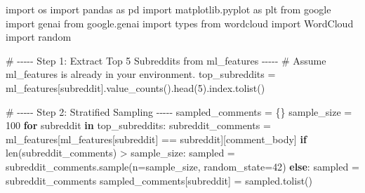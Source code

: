 \documentclass[
  12pt,
  letterpaper,
  DIV=11,
  numbers=noendperiod]{scrartcl}
\newenvironment{Shaded}{\begin{snugshade}}{\end{snugshade}}
\newcommand{\BuiltInTok}[1]{\textcolor[rgb]{0.00,0.23,0.31}{#1}}
\newcommand{\CommentTok}[1]{\textcolor[rgb]{0.37,0.37,0.37}{#1}}
\newcommand{\ControlFlowTok}[1]{\textcolor[rgb]{0.00,0.23,0.31}{\textbf{#1}}}
\newcommand{\DecValTok}[1]{\textcolor[rgb]{0.68,0.00,0.00}{#1}}
\newcommand{\ImportTok}[1]{\textcolor[rgb]{0.00,0.46,0.62}{#1}}
\newcommand{\KeywordTok}[1]{\textcolor[rgb]{0.00,0.23,0.31}{\textbf{#1}}}
\newcommand{\NormalTok}[1]{\textcolor[rgb]{0.00,0.23,0.31}{#1}}
\newcommand{\OperatorTok}[1]{\textcolor[rgb]{0.37,0.37,0.37}{#1}}
\newcommand{\StringTok}[1]{\textcolor[rgb]{0.13,0.47,0.30}{#1}}
\begin{document}
\begin{Shaded}
\begin{Highlighting}[]
\ImportTok{import}\NormalTok{ os}
\ImportTok{import}\NormalTok{ pandas }\ImportTok{as}\NormalTok{ pd}
\ImportTok{import}\NormalTok{ matplotlib.pyplot }\ImportTok{as}\NormalTok{ plt}
\ImportTok{from}\NormalTok{ google }\ImportTok{import}\NormalTok{ genai}
\ImportTok{from}\NormalTok{ google.genai }\ImportTok{import}\NormalTok{ types}
\ImportTok{from}\NormalTok{ wordcloud }\ImportTok{import}\NormalTok{ WordCloud}
\ImportTok{import}\NormalTok{ random}

\CommentTok{\# {-}{-}{-}{-}{-} Step 1: Extract Top 5 Subreddits from ml\_features {-}{-}{-}{-}{-}}
\CommentTok{\# Assume ml\_features is already in your environment.}
\NormalTok{top\_subreddits }\OperatorTok{=}\NormalTok{ ml\_features[}\StringTok{\textquotesingle{}subreddit\textquotesingle{}}\NormalTok{].value\_counts().head(}\DecValTok{5}\NormalTok{).index.tolist()}

\CommentTok{\# {-}{-}{-}{-}{-} Step 2: Stratified Sampling {-}{-}{-}{-}{-} }
\NormalTok{sampled\_comments }\OperatorTok{=}\NormalTok{ \{\}}
\NormalTok{sample\_size }\OperatorTok{=} \DecValTok{100}
\ControlFlowTok{for}\NormalTok{ subreddit }\KeywordTok{in}\NormalTok{ top\_subreddits:}
\NormalTok{    subreddit\_comments }\OperatorTok{=}\NormalTok{ ml\_features[ml\_features[}\StringTok{\textquotesingle{}subreddit\textquotesingle{}}\NormalTok{] }\OperatorTok{==}\NormalTok{ subreddit][}\StringTok{\textquotesingle{}comment\_body\textquotesingle{}}\NormalTok{]}
    \ControlFlowTok{if} \BuiltInTok{len}\NormalTok{(subreddit\_comments) }\OperatorTok{\textgreater{}}\NormalTok{ sample\_size:}
\NormalTok{        sampled }\OperatorTok{=}\NormalTok{ subreddit\_comments.sample(n}\OperatorTok{=}\NormalTok{sample\_size, random\_state}\OperatorTok{=}\DecValTok{42}\NormalTok{)}
    \ControlFlowTok{else}\NormalTok{:}
\NormalTok{        sampled }\OperatorTok{=}\NormalTok{ subreddit\_comments}
\NormalTok{    sampled\_comments[subreddit] }\OperatorTok{=}\NormalTok{ sampled.tolist()}


\end{Highlighting}
\end{Shaded}
\end{document}
